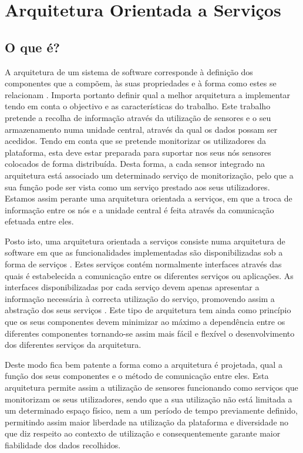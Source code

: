 \chapter{Arquitetura Orientada a Serviços}

\section{O que é?}
A arquitetura de um sistema de software corresponde à definição dos componentes que a compõem, às suas propriedades e à forma como estes se relacionam \cite{bosch2004software}. Importa portanto definir qual a melhor arquitetura a implementar tendo em conta o objectivo e as características do trabalho. Este trabalho pretende a recolha de informação através da utilização de sensores e o seu armazenamento numa unidade central, através da qual os dados possam ser acedidos. Tendo em conta que se pretende monitorizar os utilizadores da plataforma, esta deve estar preparada para suportar nos seus nós sensores colocados de forma distribuída. Desta forma, a cada sensor integrado na arquitetura está associado um determinado serviço de monitorização, pelo que a sua função pode ser vista como um serviço prestado aos seus utilizadores. Estamos assim perante uma arquitetura orientada a serviços, em que a troca de informação entre os nós e a unidade central é feita através da comunicação efetuada entre eles.

Posto isto, uma arquitetura orientada a serviços consiste numa arquitetura de software em que as funcionalidades implementadas são disponibilizadas sob a forma de serviços \cite{he2003service, papazoglou2003service}. Estes serviços contém normalmente interfaces através das quais é estabelecida a comunicação entre os diferentes serviços ou aplicações. As interfaces disponibilizadas por cada serviço devem apenas apresentar a informação necessária à correcta utilização do serviço, promovendo assim a abstração dos seus serviços \cite{erl2004service, krafzig2005enterprise}. Este tipo de arquitetura tem ainda como princípio que os seus componentes devem minimizar ao máximo a dependência entre os diferentes componentes \cite{erl2004service, krafzig2005enterprise} tornando-se assim mais fácil e flexível o desenvolvimento dos diferentes serviços da arquitetura.

Deste modo fica bem patente a forma como a arquitetura é projetada, qual a função dos seus componentes e o método de comunicação entre eles. Esta arquitetura permite assim a utilização de sensores funcionando como serviços que monitorizam os seus utilizadores, sendo que a sua utilização não está limitada a um determinado espaço físico, nem a um período de tempo previamente definido, permitindo assim maior liberdade na utilização da plataforma e diversidade no que diz respeito ao contexto de utilização e consequentemente garante maior fiabilidade dos dados recolhidos.


